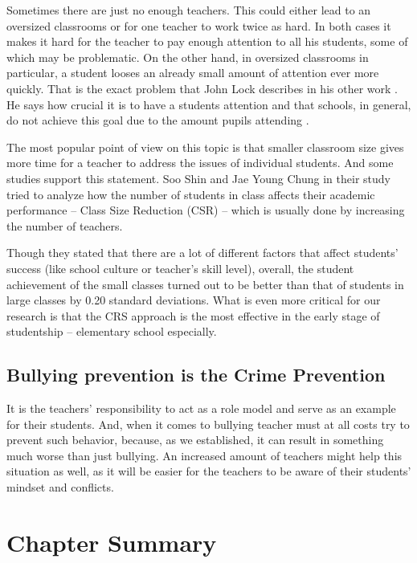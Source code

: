 \documentclass[thesis=B,english]{FITthesis}[2012/10/20]
\begin{document}
Sometimes there are just no enough teachers. This could either lead to an oversized classrooms or for one teacher to work twice as hard. In both cases it makes it hard for the teacher to pay enough attention to all his students, some of which may be problematic. On the other hand, in oversized classrooms in particular, a student  looses an already small amount of attention ever more quickly.  That is the exact problem that John Lock describes in his other work \cite{locke2013some}. He says how crucial it is  to have a students attention and that schools, in general, do not achieve this goal due to the amount pupils attending \cite{locke2013some}.

 The most popular point of view on this topic is that smaller classroom size gives more time for a teacher to address the issues of individual students. And some studies support this statement.  Soo Shin and Jae Young Chung in their study \cite{classsize} tried to analyze how the number of students in class affects their academic performance -- Class Size Reduction (CSR) -- which is usually done by increasing the number of teachers.
 
 Though they stated that there are a lot of different factors that affect students' success (like school culture or teacher's skill level), overall, the student achievement of the small classes turned out to be better than that of students in large classes by 0.20 standard deviations. What is even more critical for our research is that the CRS approach is the most effective in the early stage of studentship -- elementary school especially. 
 
 \subsection{Bullying prevention is the Crime Prevention}
 
 
It is the teachers' responsibility to act as a role model and serve as an example for their students. And, when it comes to bullying teacher must at all costs try to prevent such behavior, because, as we established, it can result in something much worse than just bullying.  An increased amount of teachers might help this situation as well, as it will be easier for the teachers to be aware of their students' mindset and conflicts.

 

 
\section{Chapter Summary}
\end{document}
